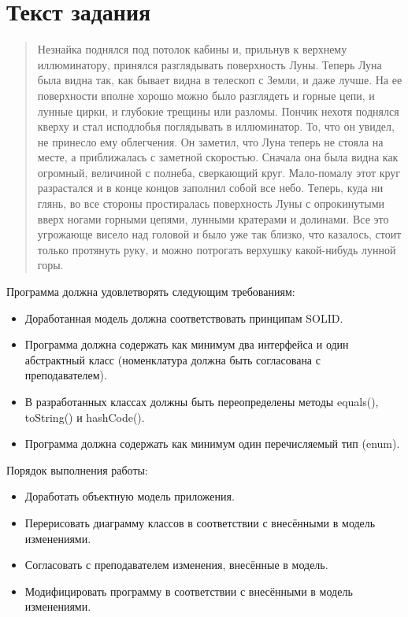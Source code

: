 \section{Текст задания}
\begin{quote}
Незнайка поднялся под потолок кабины и, прильнув к верхнему иллюминатору, принялся разглядывать поверхность Луны. Теперь Луна была видна так, как бывает видна в телескоп с Земли, и даже лучше. На ее поверхности вполне хорошо можно было разглядеть и горные цепи, и лунные цирки, и глубокие трещины или разломы. Пончик нехотя поднялся кверху и стал исподлобья поглядывать в иллюминатор. То, что он увидел, не принесло ему облегчения. Он заметил, что Луна теперь не стояла на месте, а приближалась с заметной скоростью. Сначала она была видна как огромный, величиной с полнеба, сверкающий круг. Мало-помалу этот круг разрастался и в конце концов заполнил собой все небо. Теперь, куда ни глянь, во все стороны простиралась поверхность Луны с опрокинутыми вверх ногами горными цепями, лунными кратерами и долинами. Все это угрожающе висело над головой и было уже так близко, что казалось, стоит только протянуть руку, и можно потрогать верхушку какой-нибудь лунной горы.
\end{quote}

Программа должна удовлетворять следующим требованиям:

\begin{itemize}
\item Доработанная модель должна соответствовать принципам SOLID.
\item Программа должна содержать как минимум два интерфейса и один абстрактный класс (номенклатура должна быть согласована с преподавателем).
\item В разработанных классах должны быть переопределены методы equals(), toString() и hashCode().
\item Программа должна содержать как минимум один перечисляемый тип (enum).
\end{itemize}

Порядок выполнения работы:
\begin{itemize}
\item Доработать объектную модель приложения.
\item Перерисовать диаграмму классов в соответствии с внесёнными в модель изменениями.
\item Согласовать с преподавателем изменения, внесённые в модель.
\item Модифицировать программу в соответствии с внесёнными в модель изменениями.
\end{itemize}